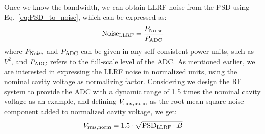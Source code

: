 \documentclass[a4paper,12pt]{article}
\begin{document}
Once we know the bandwidth, we can obtain LLRF noise from the PSD using Eq.~\eqref{eq:PSD_to_noise}, which can be expressed as:
\begin{equation}
  \centering {\rm Noise}_{\rm LLRF} = \frac{P_{\rm Noise}}{P_{\rm ADC}}
  \label{eq:dBc_def}
\end{equation}
where $P_{\rm Noise}$ and $P_{\rm ADC}$ can be given in any self-consistent power units, such as $V^2$,
and $P_{\rm ADC}$ refers to the full-scale level of the \hbox{ADC}.
As mentioned earlier, we are interested in expressing the LLRF noise in normalized units, using the nominal cavity voltage as normalizing factor. Considering we design the RF system to provide the ADC with a dynamic range of 1.5 times the nominal cavity voltage as an example, 
and defining $V_{\rm rms,norm}$ as the root-mean-square noise component added to
normalized cavity voltage, we get:
\begin{equation}
  \centering V_{\rm rms,norm} = 1.5 \cdot \sqrt{{\rm PSD}_{\rm LLRF} \cdot B}
  \label{eq:v_noise_final}
\end{equation}
\end{document}

